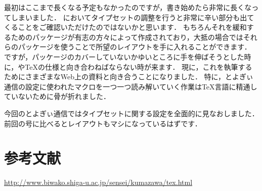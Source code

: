 最初はここまで長くなる予定もなかったのですが，書き始めたら非常に長くなってしまいました．
{\pLaTeX}においてタイプセットの調整を行うと非常に辛い部分も出てくることをご確認いただけたのではないかと思います．
もちろんそれを緩和するためのパッケージが有志の方々によって作成されており，大抵の場合ではそれらのパッケージを使うことで所望のレイアウトを手に入れることができます．
ですが，パッケージのカバーしていないかゆいところに手を伸ばそうとした時に，{\pLaTeX}や{\TeX}の仕様と向き合わねばならない時が来ます．
現に，これを執筆するためにさまざまなWeb上の資料と向き合うことになりました．
特に，とよぎぃ通信の設定に使われたマクロを一つ一つ読み解いていく作業は{\TeX}言語に精通していないために骨が折れました．

今回のとよぎぃ通信ではタイプセットに関する設定を全面的に見なおしました．
前回の号に比べるとレイアウトもマシになっているはずです．

\section*{参考文献}
\url{http://www.biwako.shiga-u.ac.jp/sensei/kumazawa/tex.html}
